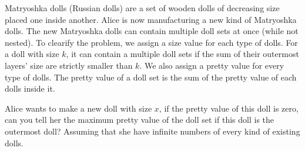 Matryoshka dolls (Russian dolls) are a set of wooden dolls of decreasing size placed one inside another. 
Alice is now manufacturing a new kind of Matryoshka dolls. The new Matryoshka dolls can contain multiple 
doll sets at once (while not nested). To clearify the problem, we assign a size value for each type of dolls. 
For a doll with size $k$, it can contain a multiple doll sets if the sum of their outermost layers' size are 
strictly smaller than $k$. We also assign a pretty value for every type of dolls. The pretty value of a doll 
set is the sum of the pretty value of each dolls inside it.

Alice wants to make a new doll with size $x$, if the pretty value of this doll is zero, can you tell her 
the maximum pretty value of the doll set if this doll is the outermost doll? Assuming that she have 
infinite numbers of every kind of existing dolls.
